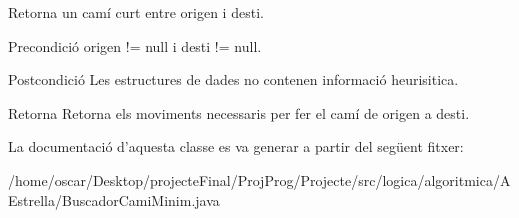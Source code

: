 Retorna un camí curt entre origen i desti. 

\begin{DoxyPrecond}{Precondició}
origen != null i desti != null. 
\end{DoxyPrecond}
\begin{DoxyPostcond}{Postcondició}
Les estructures de dades no contenen informació heurisitica. 
\end{DoxyPostcond}
\begin{DoxyReturn}{Retorna}
Retorna els moviments necessaris per fer el camí de origen a desti. 
\end{DoxyReturn}


La documentació d'aquesta classe es va generar a partir del següent fitxer\+:\begin{DoxyCompactItemize}
\item 
/home/oscar/\+Desktop/projecte\+Final/\+Proj\+Prog/\+Projecte/src/logica/algoritmica/\+A\+Estrella/Buscador\+Cami\+Minim.\+java\end{DoxyCompactItemize}
